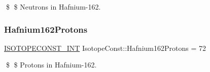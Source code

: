 \$ \$ Neutrons in Hafnium-\/162. \mbox{\label{group___isotope_const-_hafnium-_hf162_ga0f87cad9c56699399967226c63ed2a5b}} 
\subsubsection{\texorpdfstring{Hafnium162\+Protons}{Hafnium162Protons}}
{\footnotesize\ttfamily \mbox{\hyperlink{group___isotope_const-_macros_ga5f18360b3e99483a35c32d789e62621c}{I\+S\+O\+T\+O\+P\+E\+C\+O\+N\+S\+T\+\_\+\+I\+NT}} Isotope\+Const\+::\+Hafnium162\+Protons = 72}

\$ \$ Protons in Hafnium-\/162. 